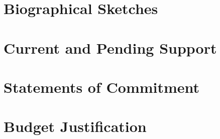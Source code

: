 \documentclass[11pt]{article}
\begin{document}
\clearpage

\section{Biographical Sketches}

\clearpage

\section{Current and Pending Support}

\clearpage

\section{Statements of Commitment}

\clearpage

\section{Budget Justification}
\end{document}
